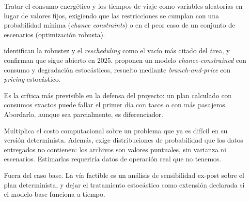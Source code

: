 \documentclass[11pt,a4paper,parskip=half]{scrartcl}
\begin{document}
\begin{campos}
\item[En qué consiste] Tratar el consumo energético y los tiempos de viaje como variables aleatorias en lugar de valores fijos, exigiendo que las restricciones se cumplan con una probabilidad mínima (\textit{chance constraints}) o en el peor caso de un conjunto de escenarios (optimización robusta).
\item[Evidencia] \citet{perumal_evspreview_2022} identifican la robustez y el \textit{rescheduling} como el vacío más citado del área, y \citet{wang_bevretrospective_2025} confirman que sigue abierto en 2025. \citet{ricard_chanceconstrained_2026} proponen un modelo \textit{chance-constrained} con consumo y degradación estocásticos, resuelto mediante \textit{branch-and-price} con \textit{pricing} estocástico.
\item[Ventajas] Es la crítica más previsible en la defensa del proyecto: un plan calculado con consumos exactos puede fallar el primer día con tacos o con más pasajeros. Abordarlo, aunque sea parcialmente, es diferenciador.
\item[Desventajas] Multiplica el costo computacional sobre un problema que ya es difícil en su versión determinista. Además, exige distribuciones de probabilidad que los datos entregados no contienen: los archivos son valores puntuales, sin varianza ni escenarios. Estimarlas requeriría datos de operación real que no tenemos.
\item[Aplicabilidad] Fuera del caso base. La vía factible es un análisis de sensibilidad ex-post sobre el plan determinista, y dejar el tratamiento estocástico como extensión declarada si el modelo base funciona a tiempo.
\end{campos}
\end{document}
